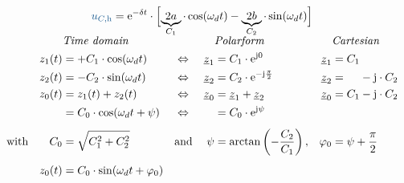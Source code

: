 %
%
\begin{frame}[t]%
\b{%
\begin{align*}
    \ecv{u_{C,\mathrm{h}}} &= \mathrm{e}^{-\delta t} \cdot
    \left[\vphantom{\Big|}\smash{
    \underbrace{2a}_{C_1} \cdot \cos(\omega_d t) - \underbrace{2b}_{C_2} \cdot \sin(\omega_d t)
    }\right]
\end{align*}%
}%
\ifvmode\vspace*{-\baselineskip}\setlength{\parskip}{4pt}\fi%
\begin{align}
    &&&\mathrlap{\textit{Time domain}}&&&&\mathrlap{\textit{Polarform}}&&\mathrlap{\textit{Cartesian}} &&\nonumber\\
    &&
        z_1(t) &= +C_1 \cdot \cos(\omega_d t)&
        &\Leftrightarrow&
        \underline{z}_1 &= C_1 \cdot \mathrm{e}^{\mathrm{j}0} &
        \underline{z}_1 &= C_1 \nonumber\\
    &&
        z_2(t) &= -C_2 \cdot \sin(\omega_d t)&
        &\Leftrightarrow&
        \underline{z}_2 &= C_2 \cdot \mathrm{e}^{-\mathrm{j}\frac{\pi}{2}} &
        \underline{z}_2 &= \hphantom{C_1} - \mathrm{j} \cdot C_2 \nonumber\\
    &&
        z_0(t) &= z_1(t) + z_2(t)&
        &\Leftrightarrow&
        \underline{z}_0 &= \underline{z}_1 + \underline{z}_2 &
        \underline{z}_0 &= C_1 - \mathrm{j} \cdot C_2 \nonumber\\
    &&
        &= C_0 \cdot \cos(\omega_d t + \psi)&
        &\Leftrightarrow&
        \hphantom{z_0} &= C_0 \cdot \mathrm{e}^{\mathrm{j}\psi} \nonumber\\[4pt]
    &\text{with}&
        C_0 &= \sqrt{C_1^2 + C_2^2}&
        &\text{and}&
        \psi  &= \arctan\left(-\frac{C_2}{C_1}\right),
        &\varphi_0 &= \psi + \frac{\pi}{2} \nonumber\\[4pt]
    &&
        z_0(t) &= C_0 \cdot \sin(\omega_d t + \varphi_0) \label{eq:dgl:rlc:homolsg:periodisch:zeigeraddition}
\end{align}%
\b{%
\vfill%
\begin{align*}

\end{align*}}
\end{frame}
